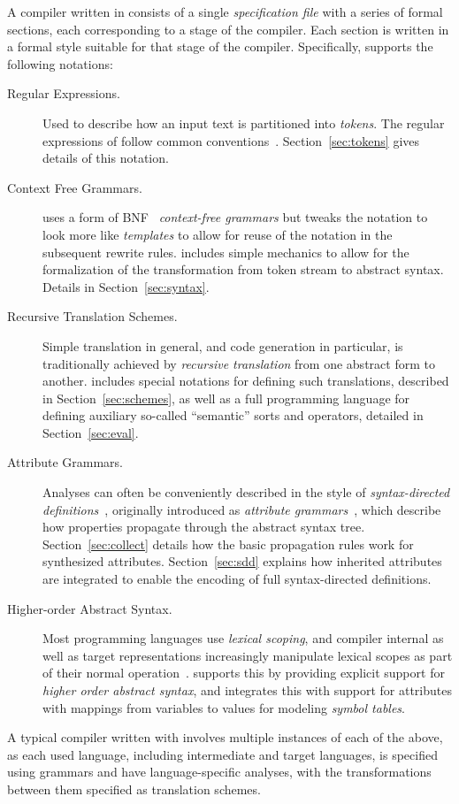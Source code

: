\documentclass[12pt]{article} %
\begin{document}
A compiler written in \HAX consists of a single \emph{specification file} with a series of formal
sections, each corresponding to a stage of the compiler.  Each section is written in a formal style
suitable for that stage of the compiler. Specifically, \HAX supports the following notations:
\begin{description}

\item[Regular Expressions.] Used to describe how an input text is partitioned into
  \emph{tokens}. The regular expressions of \HAX follow common
  conventions~\cite{Aho+:2006}. Section~\ref{sec:tokens} gives details of this notation.

\item[Context Free Grammars.] \HAX uses a form of BNF~\cite{NaurEtal:cacm1960} \emph{context-free
    grammars} but tweaks the notation to look more like \emph{templates} to allow for reuse of the
  notation in the subsequent rewrite rules. \HAX includes simple mechanics to allow for the
  formalization of the transformation from token stream to abstract syntax. Details in
  Section~\ref{sec:syntax}.

\item[Recursive Translation Schemes.] Simple translation in general, and code generation in
  particular, is traditionally achieved by \emph{recursive translation} from one abstract form to
  another.  \HAX includes special notations for defining such translations, described in
  Section~\ref{sec:schemes}, as well as a full programming language for defining auxiliary so-called
  ``semantic'' sorts and operators, detailed in Section~\ref{sec:eval}.

\item[Attribute Grammars.] Analyses can often be conveniently described in the style of
  \emph{syntax-directed definitions}~\cite{Aho+:2006}, originally introduced as \emph{attribute
    grammars}~\cite{Knuth:mst1968}, which describe how properties propagate through the abstract
  syntax tree.  Section~\ref{sec:collect} details how the basic propagation rules work for
  synthesized attributes. Section~\ref{sec:sdd} explains how inherited attributes are integrated to
  enable the encoding of full syntax-directed definitions.

\item[Higher-order Abstract Syntax.] Most programming languages use \emph{lexical scoping}, and
  compiler internal as well as target representations increasingly manipulate lexical scopes as part
  of their normal operation~\cite{MarlowPeyton-Jones:2010,Morrisett+:popl1998}. \HAX supports this
  by providing explicit support for \emph{higher order abstract syntax}, and integrates this with
  support for attributes with mappings from variables to values for modeling \emph{symbol tables}.

\end{description}
A typical compiler written with \HAX involves multiple instances of each of the above, as each used
language, including intermediate and target languages, is specified using grammars and have
language-specific analyses, with the transformations between them specified as translation schemes.
\end{document}
